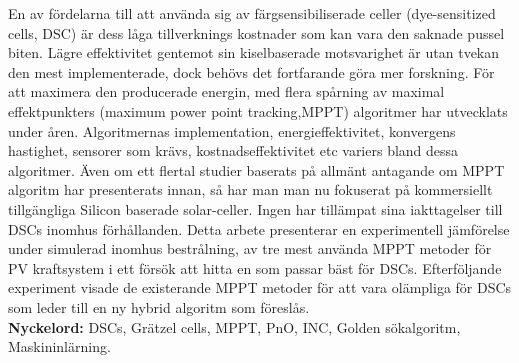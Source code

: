 En av fördelarna till att använda sig  av färgsensibiliserade celler (dye-sensitized cells, DSC) är dess låga tillverknings kostnader som kan vara den saknade pussel biten. Lägre effektivitet gentemot sin kiselbaserade motsvarighet är utan tvekan den mest implementerade, dock behövs det fortfarande göra mer forskning. För att maximera den producerade energin, med flera spårning av maximal effektpunkters (maximum power point tracking,MPPT) algoritmer har utvecklats under åren. Algoritmernas implementation, energieffektivitet, konvergens hastighet, sensorer som krävs, kostnadseffektivitet etc variers bland dessa algoritmer. Även om ett flertal studier baserats på allmänt antagande om MPPT algoritm har presenterats innan, så har man man nu fokuserat på kommersiellt tillgängliga Silicon baserade solar-celler. Ingen har tillämpat sina iakttagelser till DSCs inomhus förhållanden. Detta arbete presenterar en experimentell jämförelse under simulerad inomhus bestrålning, av tre mest använda MPPT metoder för PV kraftsystem i ett försök att hitta en som passar bäst för DSCs. Efterföljande experiment visade de existerande MPPT metoder för att vara olämpliga för DSCs som leder till en ny hybrid algoritm som föreslås.\\
{\bf Nyckelord:} DSCs, Grätzel cells, MPPT, PnO, INC, Golden sökalgoritm, Maskininlärning. 
\acresetall
